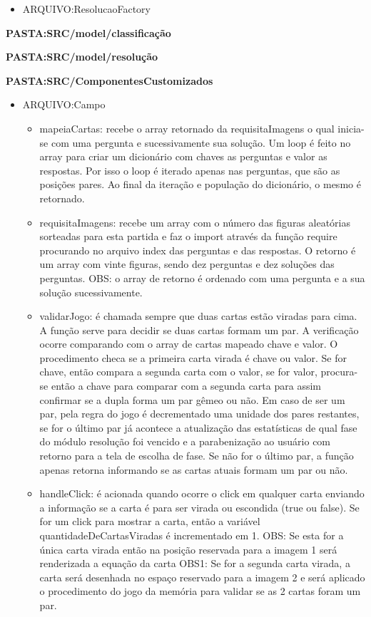 \begin{itemize}
\begin{itemize}
\begin{itemize}
	\item ARQUIVO:ResolucaoFactory
\end{itemize}

\textbf{PASTA:SRC/model/classificação}

\textbf{PASTA:SRC/model/resolução}


\textbf{PASTA:SRC/ComponentesCustomizados}
\begin{itemize}
\item ARQUIVO:Campo
	\begin{itemize}
	\item mapeiaCartas: recebe o array retornado da requisitaImagens o qual inicia-se com uma pergunta e sucessivamente sua solução. Um loop é feito no array para criar um dicionário com chaves as perguntas e valor as respostas. Por isso o loop é iterado apenas nas perguntas, que são as posições pares. Ao final da iteração e população do dicionário, o mesmo é retornado.
	
	\item requisitaImagens: recebe um array com o número das figuras aleatórias sorteadas para esta partida e faz o import através da função require procurando no arquivo index das perguntas e das respostas. O retorno é um array com vinte figuras, sendo dez perguntas e dez soluções das perguntas. OBS: o array de retorno é ordenado com uma pergunta e a sua solução sucessivamente.

	\item validarJogo: é chamada sempre que duas cartas estão viradas para cima. A função serve para decidir se duas cartas formam um par. A verificação ocorre comparando com o array de cartas mapeado chave e valor. O procedimento checa se a primeira carta virada é chave ou valor. Se for chave, então compara a segunda carta com o valor, se for valor, procura-se então a chave para comparar com a segunda carta para assim confirmar se a dupla forma um par gêmeo ou não. Em caso de ser um par, pela regra do jogo é decrementado uma unidade dos pares restantes, se for o último par já acontece a atualização das estatísticas de qual fase do módulo resolução foi vencido e a parabenização ao usuário com retorno para a tela de escolha de fase. Se não for o último par, a função apenas retorna informando se as cartas atuais formam um par ou não.

	\item handleClick: é acionada quando ocorre o click em qualquer carta enviando a informação se a carta é para ser virada ou escondida (true ou false). Se for um click para mostrar a carta, então a variável quantidadeDeCartasViradas é incrementado em 1. 
	OBS: Se esta for a única carta virada então na posição reservada para a imagem 1 será renderizada a equação da carta
	OBS1: Se for a segunda carta virada, a carta será desenhada no espaço reservado para a imagem 2 e será aplicado o procedimento do jogo da memória para validar se as 2 cartas foram um par. 


\end{itemize}
\end{itemize}
\end{itemize}
\end{itemize}
